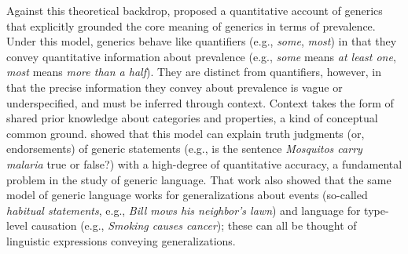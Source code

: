 \documentclass[floatsintext,doc]{apa6}
\begin{document}
Against this theoretical backdrop,  proposed a quantitative account of generics that explicitly grounded the core meaning of generics in terms of prevalence. 
Under this model, generics behave like quantifiers (e.g., \textit{some}, \textit{most}) in that they convey quantitative information about prevalence (e.g., \textit{some} means \textit{at least one}, \textit{most} means \textit{more than a half}).
They are distinct from quantifiers, however, in that the precise information they convey about prevalence is vague or underspecified, and must be inferred through context.
Context takes the form of shared prior knowledge about categories and properties, a kind of conceptual common ground.
 showed that this model can explain truth judgments (or, endorsements) of generic statements (e.g., is the sentence \emph{Mosquitos carry malaria} true or false?) with a high-degree of quantitative accuracy, a fundamental problem in the study of generic language. 
That work also showed that the same model of generic language works for generalizations about events (so-called \textit{habitual statements}, e.g., \textit{Bill mows his neighbor's lawn}) and language for type-level causation (e.g., \textit{Smoking causes cancer}); these can all be thought of linguistic expressions conveying generalizations.
\end{document}
